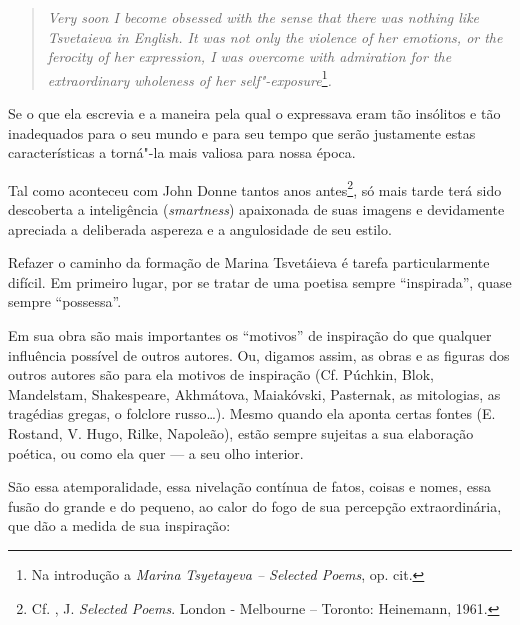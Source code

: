 \begin{quote}
\emph{Very soon I become obsessed with the sense that there was nothing
like Tsvetaieva in English. It was not only the violence of her
emotions, or the ferocity of her expression, I was overcome with
admiration for the extraordinary wholeness of her
self"-exposure}\footnote{Na introdução a \emph{Marina} \emph{Tsyetayeva --
  Selected Poems}, op. cit.}\emph{.}
\end{quote}

Se o que ela escrevia e a maneira pela qual o expressava eram tão
insólitos e tão inadequados para o seu mundo e para seu tempo que serão
justamente estas características a torná"-la mais valiosa para nossa
época.

Tal como aconteceu com John Donne tantos anos antes\footnote{Cf. ,
  J. \emph{Selected Poems}. London - Melbourne -- Toronto: Heinemann,
  1961.}, só mais tarde terá sido descoberta a inteligência
(\emph{smartness}) apaixonada de suas imagens e devidamente apreciada a
deliberada aspereza e a angulosidade de seu estilo.

Refazer o caminho da formação de Marina Tsvetáieva é tarefa
particularmente difícil. Em primeiro lugar, por se tratar de uma poetisa
sempre ``inspirada'', quase sempre ``possessa''.

Em sua obra são mais importantes os ``motivos'' de inspiração do que
qualquer influência possível de outros autores. Ou, digamos assim, as
obras e as figuras dos outros autores são para ela motivos de inspiração
(Cf. Púchkin, Blok, Mandelstam, Shakespeare, Akhmátova, Maiakóvski,
Pasternak, as mitologias, as tragédias gregas, o folclore russo\ldots{}).
Mesmo quando ela aponta certas fontes (E. Rostand, V. Hugo, Rilke,
Napoleão), estão sempre sujeitas a sua elaboração poética, ou como ela
quer --- a seu olho interior.

São essa atemporalidade, essa nivelação contínua de fatos, coisas e
nomes, essa fusão do grande e do pequeno, ao calor do fogo de sua
percepção extraordinária, que dão a medida de sua inspiração:

